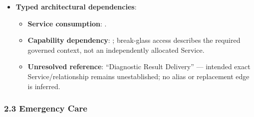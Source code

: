 \begin{itemize}
\begin{itemize}
\begin{itemize}
\item
\emph{Exposed Service}: \texttt{} — Dispatches urgent interruptive alerts to on-duty ward teams.



\end{itemize}


\end{itemize}


\item
\textbf{Typed architectural dependencies}:


\begin{itemize}

\item
\textbf{Service consumption}: \texttt{}.



\item
\textbf{Capability dependency}: \texttt{}; break-glass access describes the required governed context, not an independently allocated Service.



\item
\textbf{Unresolved reference}: “Diagnostic Result Delivery” — intended exact Service/\allowbreak{}relationship remains unestablished; no alias or replacement edge is inferred.



\end{itemize}


\end{itemize}
\label{rad:sd:86}

\par\smallskip
{}\label{rad:sd:88}



\label{rad:sd:90}
\subsubsection*{2.3 Emergency Care}
\label{rad:sd:91}


